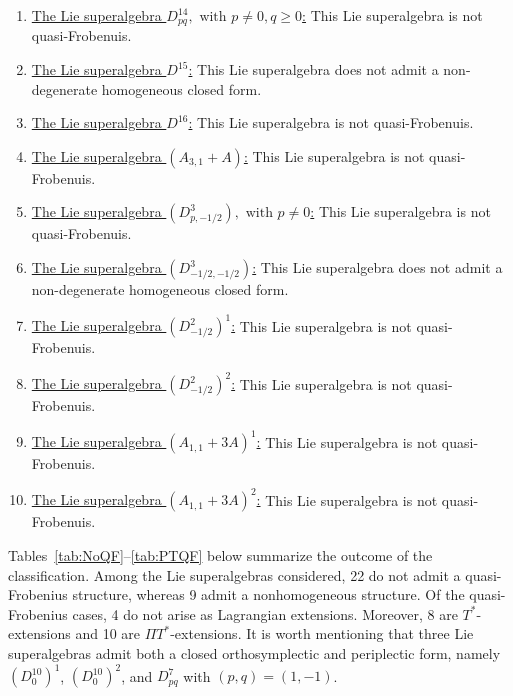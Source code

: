 \documentclass[12pt]{amsart}
\begin{document}
\begin{enumerate}
    \item \underline{The Lie superalgebra  $D^{14}_{pq}, \text{ with } p\not =0, q\geq 0$:} This Lie superalgebra is not quasi-Frobenuis. 

    \item \underline{The Lie superalgebra  $D^{15}$:} This Lie superalgebra does not admit a non-degenerate homogeneous closed form.

    \item \underline{The Lie superalgebra  $D^{16}$:} This Lie superalgebra is not quasi-Frobenuis. 

    \item \underline{The Lie superalgebra  $(A_{3,1}+A)$:} This Lie superalgebra is not quasi-Frobenuis. 

    \item \underline{The Lie superalgebra  $(D^{3}_{p,-1/2}), \text{ with } p\not =0$:} This Lie superalgebra is not quasi-Frobenuis. 

    \item \underline{The Lie superalgebra  $(D^3_{-1/2, -1/2})$:} This Lie superalgebra does not admit a non-degenerate homogeneous closed form.
    
    \item \underline{The Lie superalgebra  $(D^2_{-1/2})^1$:} This Lie superalgebra is  not quasi-Frobenuis. 
    \item \underline{The Lie superalgebra   $(D^2_{-1/2})^2$:} This Lie superalgebra is not quasi-Frobenuis. 
    \item \underline{The Lie superalgebra  $(A_{1,1}+3 A)^1$:} This Lie superalgebra is not quasi-Frobenuis. 
    \item \underline{The Lie superalgebra   $(A_{1,1}+3 A)^2$:} This Lie superalgebra is not quasi-Frobenuis. 
\end{enumerate}
\vspace{3mm}
Tables~\ref{tab:NoQF}--\ref{tab:PTQF} below summarize the outcome of the classification. 
Among the Lie superalgebras considered, 22 do not admit a quasi-Frobenius structure, 
whereas 9 admit a nonhomogeneous structure. 
Of the quasi-Frobenius cases, 4 do not arise as Lagrangian extensions. 
Moreover, 8 are $T^*$-extensions and 10 are $\Pi T^*$-extensions. It is worth mentioning that three Lie superalgebras admit both a closed orthosymplectic and periplectic form, namely 
$(D_0^{10})^1$, $(D_0^{10})^2$, and $D_{pq}^{7}$ with $(p,q)=(1,-1)$.
\end{document}
